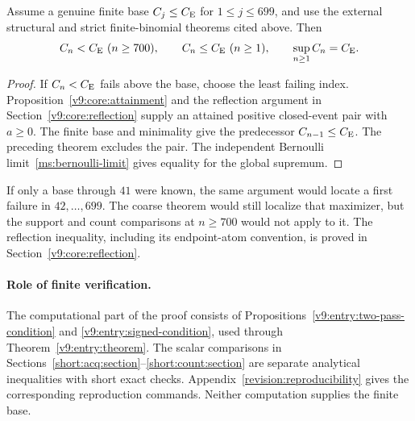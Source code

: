 \begin{theorem}\label{short:global}
Assume a genuine finite base $C_j\le C_{\mathrm E}$ for $1\le j\le699$,
and use the external structural and strict finite-binomial theorems
cited above.
Then
\[
 C_n<\CE\ (n\ge700),\qquad C_n\le\CE\ (n\ge1),
 \qquad \sup_{n\ge1}C_n=\CE.
\]
\end{theorem}
\begin{proof}
If $C_n<C_{\mathrm E}$ fails above the base, choose the least failing index.
Proposition~\ref{v9:core:attainment} and the reflection argument in
Section~\ref{v9:core:reflection} supply an attained positive closed-event
pair with $a\ge0$. The finite base and minimality give the
predecessor $C_{n-1}\le C_{\mathrm E}$. The preceding theorem excludes the pair.
The independent Bernoulli limit~\eqref{ms:bernoulli-limit} gives equality
for the global supremum.
\end{proof}

If only a base through $41$ were known, the same argument would locate
a first failure in $42,\ldots,699$. The coarse theorem would still
localize that maximizer, but the support and count comparisons at
$n\ge700$ would not apply to it. The reflection inequality, including
its endpoint-atom convention, is proved in
Section~\ref{v9:core:reflection}.

\paragraph{Role of finite verification.}
The computational part of the proof consists of
Propositions~\ref{v9:entry:two-pass-condition} and
\ref{v9:entry:signed-condition}, used through
Theorem~\ref{v9:entry:theorem}. The scalar comparisons in
Sections~\ref{short:acq:section}--\ref{short:count:section} are
separate analytical inequalities with short exact checks.
Appendix~\ref{revision:reproducibility} gives the corresponding
reproduction commands. Neither computation supplies the finite base.
